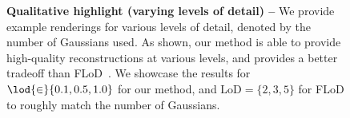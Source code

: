 \begin{figure}
  \centering
  \clogqualitativefig
  \caption{
    \textbf{Qualitative highlight (varying levels of detail) --}
    We provide example renderings for various levels of detail, denoted by the
    number of Gaussians used.
    As shown, our method is able to provide high-quality reconstructions at
    various levels, and provides a better tradeoff than
    FLoD~\cite{seo2024flod}.
    We showcase the results for $\lod{\in}\{0.1, 0.5, 1.0\}$ for our method,
    and $\text{LoD}{=}\{2,3,5\}$ for FLoD to roughly match the number of
    Gaussians.
  }
  \label{fig:clog-level-of-details}
\end{figure}